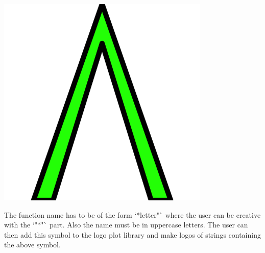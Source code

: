 \documentclass[12pt]{article}\usepackage[]{graphicx}\usepackage[usenames,dvipsnames]{color}
\newenvironment{knitrout}{}{} %
\begin{document}
\begin{knitrout}
\includegraphics[width=4in,height=4in]{figure/new_symbol-2} 

\end{knitrout}

The function name has to be of the form `*letter"` where the user can be creative with the `"*"` part. Also the name must be in uppercase letters. The user can then add this symbol to the logo plot library and make logos of strings containing the above symbol.
\end{document}
